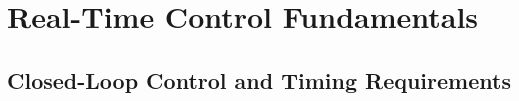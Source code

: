 \documentclass[12pt, a4paper]{report}
\begin{document}




\section{Real-Time Control Fundamentals}
\label{sec:control}

\subsection{Closed-Loop Control and Timing Requirements}
\label{subsec:closed-loop}
\end{document}
